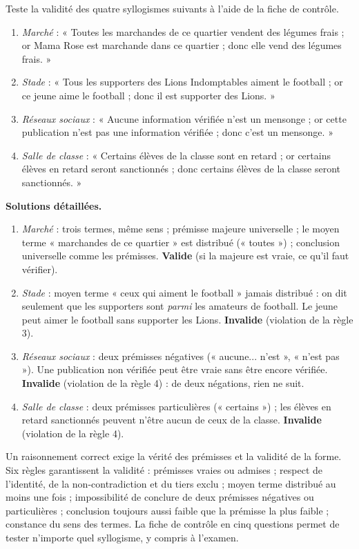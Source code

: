 \documentclass[11pt]{article}
\begin{document}
\begin{exoresolu}
Teste la validité des quatre syllogismes suivants à l'aide de la fiche de contrôle.
\begin{enumerate}
\item \emph{Marché} : « Toutes les marchandes de ce quartier vendent des légumes frais ; or Mama Rose est marchande dans ce quartier ; donc elle vend des légumes frais. »
\item \emph{Stade} : « Tous les supporters des Lions Indomptables aiment le football ; or ce jeune aime le football ; donc il est supporter des Lions. »
\item \emph{Réseaux sociaux} : « Aucune information vérifiée n'est un mensonge ; or cette publication n'est pas une information vérifiée ; donc c'est un mensonge. »
\item \emph{Salle de classe} : « Certains élèves de la classe sont en retard ; or certains élèves en retard seront sanctionnés ; donc certains élèves de la classe seront sanctionnés. »
\end{enumerate}
\tcblower
\textbf{Solutions détaillées.}
\begin{enumerate}
\item \emph{Marché} : trois termes, même sens ; prémisse majeure universelle ; le moyen terme « marchandes de ce quartier » est distribué (« toutes ») ; conclusion universelle comme les prémisses. \textbf{Valide} (si la majeure est vraie, ce qu'il faut vérifier).
\item \emph{Stade} : moyen terme « ceux qui aiment le football » jamais distribué : on dit seulement que les supporters sont \emph{parmi} les amateurs de football. Le jeune peut aimer le football sans supporter les Lions. \textbf{Invalide} (violation de la règle 3).
\item \emph{Réseaux sociaux} : deux prémisses négatives (« aucune... n'est », « n'est pas »). Une publication non vérifiée peut être vraie sans être encore vérifiée. \textbf{Invalide} (violation de la règle 4) : de deux négations, rien ne suit.
\item \emph{Salle de classe} : deux prémisses particulières (« certains ») ; les élèves en retard sanctionnés peuvent n'être aucun de ceux de la classe. \textbf{Invalide} (violation de la règle 4).
\end{enumerate}
\end{exoresolu}

\begin{aretenir}[L'essentiel]
Un raisonnement correct exige la vérité des prémisses et la validité de la forme. Six règles garantissent la validité : prémisses vraies ou admises ; respect de l'identité, de la non-contradiction et du tiers exclu ; moyen terme distribué au moins une fois ; impossibilité de conclure de deux prémisses négatives ou particulières ; conclusion toujours aussi faible que la prémisse la plus faible ; constance du sens des termes. La fiche de contrôle en cinq questions permet de tester n'importe quel syllogisme, y compris à l'examen.
\end{aretenir}
\end{document}
